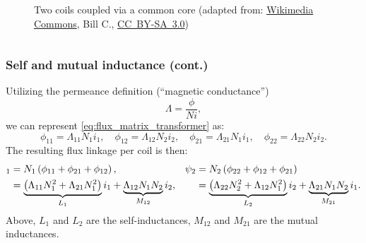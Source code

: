 \begin{frame}
\begin{columns}
\begin{column}{0.525\textwidth}
\begin{figure}
				\caption{Two coils coupled via a common core (adapted from: \href{https://commons.wikimedia.org/wiki/File:Transformer3d_col3.svg}{Wikimedia Commons}, Bill C., \href{https://creativecommons.org/licenses/by-sa/3.0/deed.en}{CC~BY-SA~3.0})}
                \label{fig:Transformer3d_col3}
			\end{figure}
		\end{column}
		\end{columns}
\end{frame}

\begin{frame}
	\frametitle{Self and mutual inductance (cont.)}
    Utilizing the permeance definition (``magnetic conductance'') 
    \begin{equation}
        \Lambda = \frac{\phi}{N i},
    \end{equation}
    \pause
    we can represent \eqref{eq:flux_matrix_transformer} as:
    \begin{equation}
        \phi_{11} = \Lambda_{11} N_1 i_1, \quad \phi_{12} = \Lambda_{12} N_2 i_2, \quad \phi_{21} = \Lambda_{21} N_1 i_1, \quad \phi_{22} = \Lambda_{22} N_2 i_2.
    \end{equation}
    \pause
    The resulting flux linkage per coil is then:
    \begin{equation}
        \begin{alignedat}{3}
        \psi_1 &= N_1\left(\phi_{11} + \phi_{21} + \phi_{12}\right), \quad && \psi_2 && =  N_2\left(\phi_{22} + \phi_{12} + \phi_{21}\right)\\
               &=\underbrace{\left(\Lambda_{11}N_1^2+\Lambda_{21}N_1^2\right)}_{L_1}i_1 + \underbrace{\Lambda_{12}N_1N_2}_{M_{12}}i_2, \quad && && =\underbrace{\left(\Lambda_{22}N_2^2+\Lambda_{12}N_1^2\right)}_{L_2}i_2 + \underbrace{\Lambda_{21}N_1N_2}_{M_{21}}i_1. 
        \end{alignedat}
        \label{eq:flux_linkage_transformer}
    \end{equation}
    Above, $L_1$ and $L_2$ are the self-inductances, $M_{12}$ and $M_{21}$ are the mutual inductances.
\end{frame}

